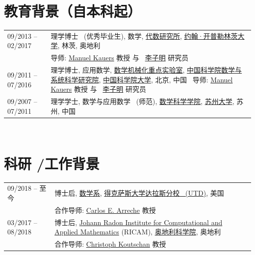 \documentclass[a4paper,12pt]{article}
\begin{document}
\begin{CJK*}{UTF8}{gbsn}

\section*{\Large{教育背景（自本科起）}}
\begin{tabular}{@{}p{1.4in}p{4in}}
09/2013 -- 02/2017    & 理学博士 \ (优秀毕业生), 数学,  
                        \href{http://www.jku.at/algebra/content}{代数研究所}, 
                        \href{http://www.jku.at/content}{约翰·开普勒林茨大学}, 林茨, 奥地利 \\                        
                      & 导师: \href{http://www.kauers.de/}{Manuel Kauers} 教授 与  
                         \ \href{http://mmrc.iss.ac.cn/~zmli/}{李子明} 研究员\\
09/2011 -- 07/2016    & 理学博士,  应用数学, 
                        \href{http://english.mmrc.amss.cas.cn/}{数学机械化重点实验室}, 
                        \href{http://www.amss.ac.cn/}{中国科学院数学与系统科学研究院}, 
                        \href{http://www.gucas.ac.cn/}{中国科学院大学}, 北京, 中国 
                        \ 导师: \href{http://www.kauers.de/}{Manuel Kauers} 教授 与  
                         \ \href{http://mmrc.iss.ac.cn/~zmli/}{李子明} 研究员\\
09/2007 -- 07/2011    & 理学学士, 数学与应用数学 \ (师范), \href{http://math.suda.edu.cn/}{数学科学学院}, 
                        \href{http://www.suda.edu.cn/}{苏州大学}, 苏州, 中国
\end{tabular} \\


\section*{\Large{科研 \slash 工作背景}}
\begin{tabular}{@{}p{1.4in}p{4in}}
09/2018 -- 至今        & 博士后, \href{https://www.utdallas.edu/math/}{数学系}, 
                        \href{https://www.utdallas.edu/}{得克萨斯大学达拉斯分校 \ (UTD)}, 美国 \\
                       & 合作导师: \href{https://www.utdallas.edu/~arreche/}{Carlos E. Arreche} 教授 \\ 
03/2017 -- 08/2018        & 博士后, 
                        \href{https://www.ricam.oeaw.ac.at/}{Johann Radon Institute for Computational and Applied Mathematics} (RICAM),
                        \href{http://www.oeaw.ac.at/en/austrian-academy-of-sciences/}{奥地利科学院}, 奥地利 \\                       
                       & 合作导师: \href{http://www.koutschan.de/}{Christoph Koutschan} 教授\\
\end{tabular}


\end{CJK*}
\end{document}
